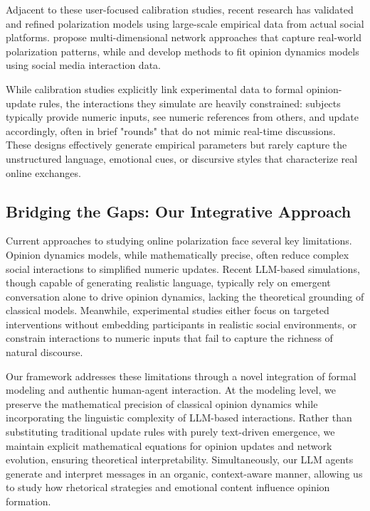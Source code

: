 Adjacent to these user-focused calibration studies, recent research has validated and refined polarization models using large-scale empirical data from actual social platforms. \citep{phillips_high-dimensional_2023} propose multi-dimensional network approaches that capture real-world polarization patterns, while \citep{valensise_drivers_2023} and \citep{peralta_multidimensional_2024} develop methods to fit opinion dynamics models using social media interaction data.

While calibration studies explicitly link experimental data to formal opinion-update rules, the interactions they simulate are heavily constrained: subjects typically provide numeric inputs, see numeric references from others, and update accordingly, often in brief "rounds" that do not mimic real-time discussions. These designs effectively generate empirical parameters but rarely capture the unstructured language, emotional cues, or discursive styles that characterize real online exchanges.

\subsection{Bridging the Gaps: Our Integrative Approach}
Current approaches to studying online polarization face several key limitations. Opinion dynamics models, while mathematically precise, often reduce complex social interactions to simplified numeric updates. Recent LLM-based simulations, though capable of generating realistic language, typically rely on emergent conversation alone to drive opinion dynamics, lacking the theoretical grounding of classical models. Meanwhile, experimental studies either focus on targeted interventions without embedding participants in realistic social environments, or constrain interactions to numeric inputs that fail to capture the richness of natural discourse.

Our framework addresses these limitations through a novel integration of formal modeling and authentic human-agent interaction. At the modeling level, we preserve the mathematical precision of classical opinion dynamics while incorporating the linguistic complexity of LLM-based interactions. Rather than substituting traditional update rules with purely text-driven emergence, we maintain explicit mathematical equations for opinion updates and network evolution, ensuring theoretical interpretability. Simultaneously, our LLM agents generate and interpret messages in an organic, context-aware manner, allowing us to study how rhetorical strategies and emotional content influence opinion formation.

